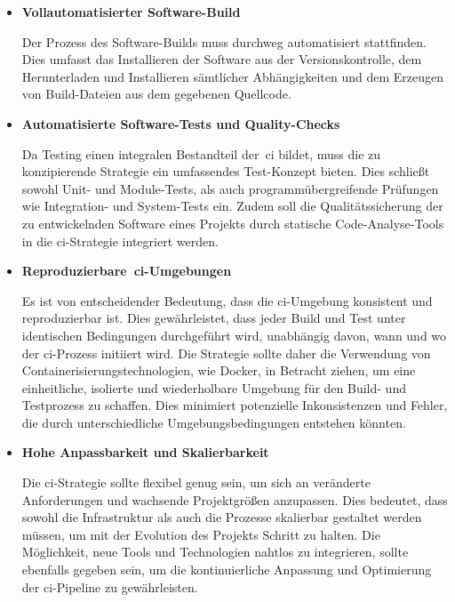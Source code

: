 \begin{itemize}
    \item {
        \textbf{Vollautomatisierter Software-Build}\par
        Der Prozess des Software-Builds muss durchweg automatisiert stattfinden.
        Dies umfasst das Installieren der Software aus der Versionskontrolle, dem Herunterladen und Installieren
        sämtlicher Abhängigkeiten und dem Erzeugen von Build-Dateien aus dem gegebenen Quellcode.
    }

    \item {
        \textbf{Automatisierte Software-Tests und Quality-Checks}\par
        Da Testing einen integralen Bestandteil der\ \acrshort{ci} bildet, muss die zu konzipierende Strategie ein
        umfassendes Test-Konzept bieten.
        Dies schließt sowohl Unit- und Module-Tests, als auch programmübergreifende Prüfungen wie Integration- und
        System-Tests ein.
        Zudem soll die Qualitätssicherung der zu entwickelnden Software eines Projekts durch statische
        Code-Analyse-Tools in die \acrshort{ci}-Strategie integriert werden.
    }

    \item {
        \textbf{Reproduzierbare\ \acrshort{ci}-Umgebungen}\par
        Es ist von entscheidender Bedeutung, dass die \acrshort{ci}-Umgebung konsistent und reproduzierbar ist.
        Dies gewährleistet, dass jeder Build und Test unter identischen Bedingungen durchgeführt wird, unabhängig davon,
        wann und wo der \acrshort{ci}-Prozess initiiert wird.
        Die Strategie sollte daher die Verwendung von Containerisierungstechnologien, wie Docker, in Betracht ziehen,
        um eine einheitliche, isolierte und wiederholbare Umgebung für den Build- und Testprozess zu schaffen.
        Dies minimiert potenzielle Inkonsistenzen und Fehler, die durch unterschiedliche Umgebungsbedingungen entstehen
        könnten.
    }

    \item {
        \textbf{Hohe Anpassbarkeit und Skalierbarkeit}\par
        Die \acrshort{ci}-Strategie sollte flexibel genug sein, um sich an veränderte Anforderungen und wachsende
        Projektgrößen anzupassen.
        Dies bedeutet, dass sowohl die Infrastruktur als auch die Prozesse skalierbar gestaltet werden müssen, um mit
        der Evolution des Projekts Schritt zu halten.
        Die Möglichkeit, neue Tools und Technologien nahtlos zu integrieren, sollte ebenfalls gegeben sein, um die
        kontinuierliche Anpassung und Optimierung der \acrshort{ci}-Pipeline zu gewährleisten.
    }


\end{itemize}
